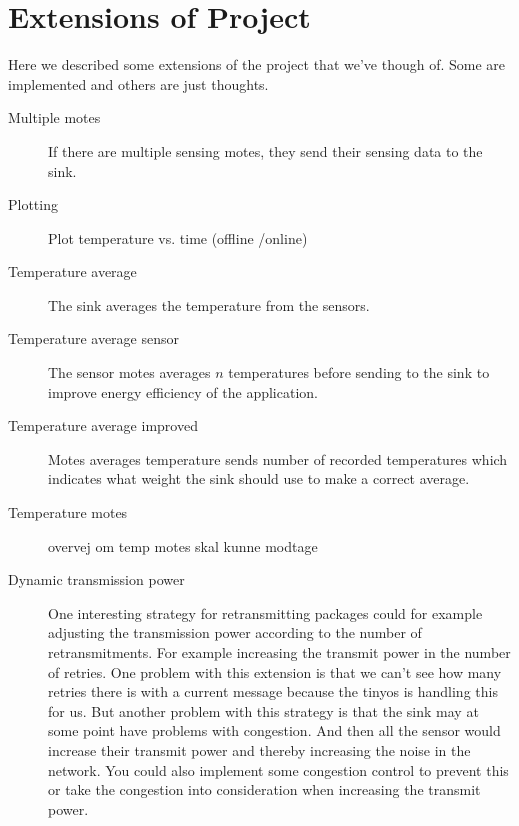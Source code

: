 \section{Extensions of Project}
Here we described some extensions of the project that we've though of. Some are implemented and others are just thoughts.
\begin{description}
\item[Multiple motes] If there are multiple sensing motes, they send their sensing data to the sink.
\item[Plotting] Plot temperature vs. time (offline /online)
\item[Temperature average] The sink averages the temperature from the sensors.
\item[Temperature average sensor] The sensor motes averages $n$ temperatures before sending to the sink to improve energy efficiency of the application.
\item[Temperature average improved] Motes averages temperature sends number of recorded temperatures which indicates what weight the sink should use to make a correct average.
\item[Temperature motes] overvej om temp motes skal kunne modtage
\item[Dynamic transmission power] One interesting strategy for retransmitting packages could for example adjusting the transmission power according to the number of retransmitments. For example increasing the transmit power in the number of retries. One problem with this extension is that we can't see how many retries there is with a current message because the tinyos is handling this for us. But another problem with this strategy is that the sink may at some point have problems with congestion. And then all the sensor would increase their transmit power and thereby increasing the noise in the network. You could also implement some congestion control to prevent this or take the congestion into consideration when increasing the transmit power.
\end{description}
